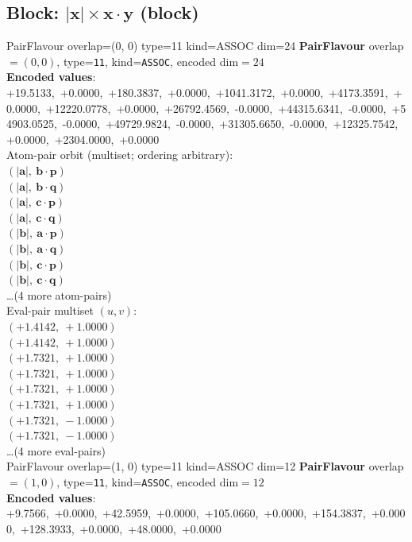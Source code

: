 \documentclass[a4paper,11pt]{article}
\newcommand{\vc}[1]{\ensuremath{\mathbf{#1}}}
\newcommand{\dnfagmiihhiejm}[1]{|\vc{#1}|}
\newcommand{\pdcegfomjfhook}[2]{\mathbf{#1} \cdot \mathbf{#2}}
\begin{document}
\subsection{Block: $\dnfagmiihhiejm{x} \times \pdcegfomjfhook{x}{y}$  (block)}
    PairFlavour  overlap=(0, 0)  type=11  kind=ASSOC  dim=24
\textbf{PairFlavour} overlap$=(0, 0)$, type=\texttt{11}, kind=\texttt{ASSOC}, encoded dim$=24$\\
\textbf{      Encoded values}: +19.5133,\ +0.0000,\ +180.3837,\ +0.0000,\ +1041.3172,\ +0.0000,\ +4173.3591,\ +0.0000,\ +12220.0778,\ +0.0000,\ +26792.4569,\ -0.0000,\ +44315.6341,\ -0.0000,\ +54903.0525,\ -0.0000,\ +49729.9824,\ -0.0000,\ +31305.6650,\ -0.0000,\ +12325.7542,\ +0.0000,\ +2304.0000,\ +0.0000\\
\quad Atom-pair orbit (multiset; ordering arbitrary):\\
$(\dnfagmiihhiejm{a},\ \pdcegfomjfhook{b}{p})$\\
$(\dnfagmiihhiejm{a},\ \pdcegfomjfhook{b}{q})$\\
$(\dnfagmiihhiejm{a},\ \pdcegfomjfhook{c}{p})$\\
$(\dnfagmiihhiejm{a},\ \pdcegfomjfhook{c}{q})$\\
$(\dnfagmiihhiejm{b},\ \pdcegfomjfhook{a}{p})$\\
$(\dnfagmiihhiejm{b},\ \pdcegfomjfhook{a}{q})$\\
$(\dnfagmiihhiejm{b},\ \pdcegfomjfhook{c}{p})$\\
$(\dnfagmiihhiejm{b},\ \pdcegfomjfhook{c}{q})$\\
\quad \ldots (4 more atom-pairs)\\
\quad Eval-pair multiset $(u, v)$:\\
$(+1.4142,\ +1.0000)$\\
$(+1.4142,\ +1.0000)$\\
$(+1.7321,\ +1.0000)$\\
$(+1.7321,\ +1.0000)$\\
$(+1.7321,\ +1.0000)$\\
$(+1.7321,\ +1.0000)$\\
$(+1.7321,\ -1.0000)$\\
$(+1.7321,\ -1.0000)$\\
\quad \ldots (4 more eval-pairs)\\
    PairFlavour  overlap=(1, 0)  type=11  kind=ASSOC  dim=12
\textbf{PairFlavour} overlap$=(1, 0)$, type=\texttt{11}, kind=\texttt{ASSOC}, encoded dim$=12$\\
\textbf{      Encoded values}: +9.7566,\ +0.0000,\ +42.5959,\ +0.0000,\ +105.0660,\ +0.0000,\ +154.3837,\ +0.0000,\ +128.3933,\ +0.0000,\ +48.0000,\ +0.0000\\
\end{document}
